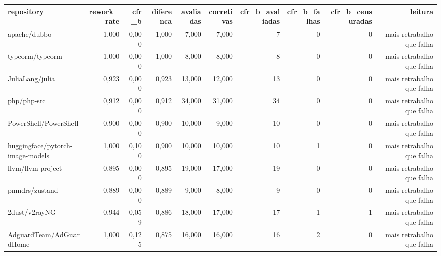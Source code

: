 \begin{tabular}{lrrrrrrrrr}
\hline
repository & rework\_rate & cfr\_b & diferenca & avaliadas & corretivas & cfr\_b\_avaliadas & cfr\_b\_falhas & cfr\_b\_censuradas & leitura \\
\hline
apache/dubbo & 1,000 & 0,000 & 1,000 & 7,000 & 7,000 & 7 & 0 & 0 & mais retrabalho que falha \\
typeorm/typeorm & 1,000 & 0,000 & 1,000 & 8,000 & 8,000 & 8 & 0 & 0 & mais retrabalho que falha \\
JuliaLang/julia & 0,923 & 0,000 & 0,923 & 13,000 & 12,000 & 13 & 0 & 0 & mais retrabalho que falha \\
php/php-src & 0,912 & 0,000 & 0,912 & 34,000 & 31,000 & 34 & 0 & 0 & mais retrabalho que falha \\
PowerShell/PowerShell & 0,900 & 0,000 & 0,900 & 10,000 & 9,000 & 10 & 0 & 0 & mais retrabalho que falha \\
huggingface/pytorch-image-models & 1,000 & 0,100 & 0,900 & 10,000 & 10,000 & 10 & 1 & 0 & mais retrabalho que falha \\
llvm/llvm-project & 0,895 & 0,000 & 0,895 & 19,000 & 17,000 & 19 & 0 & 0 & mais retrabalho que falha \\
pmndrs/zustand & 0,889 & 0,000 & 0,889 & 9,000 & 8,000 & 9 & 0 & 0 & mais retrabalho que falha \\
2dust/v2rayNG & 0,944 & 0,059 & 0,886 & 18,000 & 17,000 & 17 & 1 & 1 & mais retrabalho que falha \\
AdguardTeam/AdGuardHome & 1,000 & 0,125 & 0,875 & 16,000 & 16,000 & 16 & 2 & 0 & mais retrabalho que falha \\
\hline
\end{tabular}

